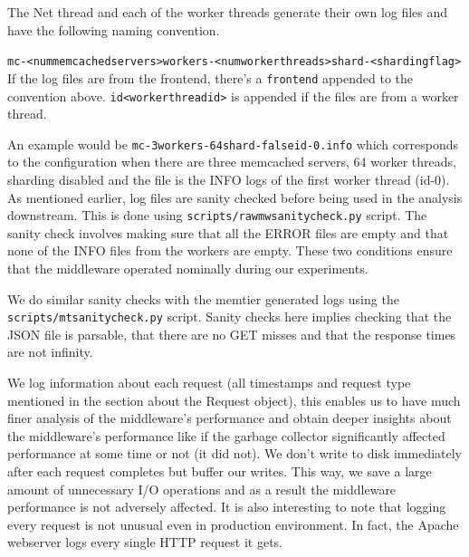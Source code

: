 \documentclass[11pt,a4paper]{article}
\begin{document}
	

	
	The Net thread and each of the worker threads generate their own log files and have the following naming convention.
	
	\texttt{mc-<num\textunderscore memcached\textunderscore servers>\textunderscore workers-<num\textunderscore worker\textunderscore threads>\textunderscore shard-<sharding\textunderscore flag>\textunderscore }
	If the log files are from the frontend, there's a \texttt{frontend} appended to the convention above. \texttt{id} is appended if the files are from a worker thread.
	
	An example would be \texttt{mc-3\textunderscore workers-64\textunderscore shard-false\textunderscore id-0.info} which corresponds to the configuration when there are three memcached servers, 64 worker threads, sharding disabled and the file is the INFO logs of the first worker thread (id-0). As mentioned earlier, log files are sanity checked before being used in the analysis downstream. This is done using \texttt{scripts/raw\textunderscore mw\textunderscore sanity\textunderscore check.py} script. The sanity check involves making sure that all the ERROR files are empty and that none of the INFO files from the workers are empty. These two conditions ensure that the middleware operated nominally during our experiments.
	
	We do similar sanity checks with the memtier generated logs using the \\ \texttt{scripts/mt\textunderscore sanity\textunderscore check.py} script. Sanity checks here implies checking that the JSON file is parsable, that there are no GET misses and that the response times are not infinity.
	
	We log information about each request (all timestamps and request type mentioned in the section about the Request object), this enables us to have much finer analysis of the middleware’s performance and obtain deeper insights about the middleware’s performance like if the garbage collector significantly affected performance at some time or not (it did not). We don’t write to disk immediately after each request completes but buffer our writes. This way, we save a large amount of unnecessary I/O operations and as a result the middleware performance is not adversely affected. It is also interesting to note that logging every request is not unusual even in production environment. In fact, the Apache webserver logs every single HTTP request it gets.
	
\end{document}
